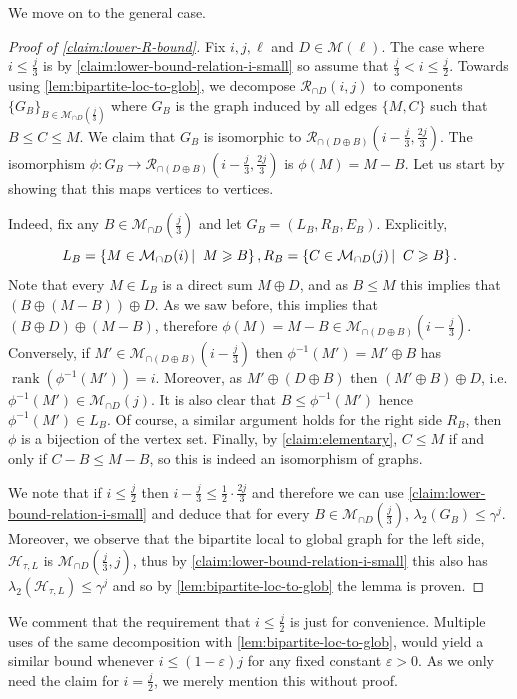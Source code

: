 \documentclass[10pt,a4paper]{article}
\newcommand{\prettyref}[1]{\cref{#1}}
\theoremstyle{definition}
\theoremstyle{remark}
\newcommand\sett[2]{\left\{ #1 \left| \; \vphantom{#1 #2} \right. #2  \right\}}
\newcommand{\set}[1]{\{#1\}}
\DeclareMathOperator{\rank}{rank}
\renewcommand{\leq}{\leqslant}
\renewcommand{\geq}{\geqslant}
\numberwithin{equation}{section}
\let\pref=\prettyref
\def\B{\mathcal{H}}
\def\MP{\mathcal{M}}
\begin{document}
We move on to the general case.
\begin{proof}[Proof of \pref{claim:lower-R-bound}]
    Fix \(i,j,\ell\) and \(D \in \MP(\ell)\). The case where \(i \leq \frac{j}{3}\) is by \pref{claim:lower-bound-relation-i-small} so assume that \(\frac{j}{3} < i \leq \frac{j}{2}\). Towards using \pref{lem:bipartite-loc-to-glob}, we decompose \(\mathcal{R}_{\cap D}(i,j)\) to components \(\set{G_B}_{B \in \MP_{\cap D}(\frac{j}{3})}\) where \(G_B\) is the graph induced by all edges \(\set{M,C}\) such that \(B \leq C \leq M\). We claim that \(G_B\) is isomorphic to \(\mathcal{R}_{\cap (D \oplus B)}(i-\frac{j}{3},\frac{2j}{3})\). The isomorphism \(\phi: G_B \to \mathcal{R}_{\cap (D \oplus B)}(i-\frac{j}{3},\frac{2j}{3})\) is \(\phi(M) = M-B\). Let us start by showing that this maps vertices to vertices.

    Indeed, fix any \(B \in \MP_{\cap D}(\frac{j}{3})\) and let \(G_B=(L_B,R_B,E_B)\). Explicitly,
    \[L_{B} = \sett{M \in \MP_{\cap D}(i)}{M \geq B}, R_{B} = \sett{C \in \MP_{\cap D}(j)}{C \geq B}.\]
    Note that every \(M \in L_B\) is a direct sum \(M \oplus D\), and as \(B \leq M\) this implies that \((B \oplus (M-B)) \oplus D\). As we saw before, this implies that \((B \oplus D) \oplus (M-B)\), therefore \(\phi(M)=M-B \in \MP_{\cap (D \oplus B)}(i-\frac{j}{3})\). Conversely, if \(M' \in \MP_{\cap (D \oplus B)}(i-\frac{j}{3})\) then \(\phi^{-1}(M') = M' \oplus B\) has \(\rank(\phi^{-1}(M')) = i\). Moreover, as \(M' \oplus (D \oplus B)\) then \((M' \oplus B) \oplus D\), i.e. \(\phi^{-1}(M') \in \MP_{\cap D}(j)\). It is also clear that \(B \leq \phi^{-1}(M')\) hence \(\phi^{-1}(M') \in L_B\). Of course, a similar argument holds for the right side \(R_B\), then \(\phi\) is a bijection of the vertex set. Finally, by \pref{claim:elementary}, \(C \leq M\) if and only if \(C-B \leq M-B\), so this is indeed an isomorphism of graphs.

    We note that if \(i \leq \frac{j}{2}\) then \(i-\frac{j}{3} \leq \frac{1}{2} \cdot \frac{2j}{3}\) and therefore we can use \pref{claim:lower-bound-relation-i-small} and deduce that for every \(B \in \MP_{\cap D}(\frac{j}{3})\), \(\lambda_2(G_B) \leq \gamma^{j}\). Moreover, we observe that the bipartite local to global graph for the left side, \(\B_{\tau, L}\) is \(\MP_{\cap D}(\frac{j}{3},j)\), thus by \pref{claim:lower-bound-relation-i-small} this also has \(\lambda_2(\B_{\tau, L}) \leq \gamma^{j}\) and so by \pref{lem:bipartite-loc-to-glob} the lemma is proven.
\end{proof}
We comment that the requirement that \(i \leq \frac{j}{2}\) is just for convenience. Multiple uses of the same decomposition with \pref{lem:bipartite-loc-to-glob}, would yield a similar bound whenever \(i \leq (1-\varepsilon)j\) for any fixed constant \(\varepsilon > 0\). As we only need the claim for \(i=\frac{j}{2}\), we merely mention this without proof.
\end{document}

